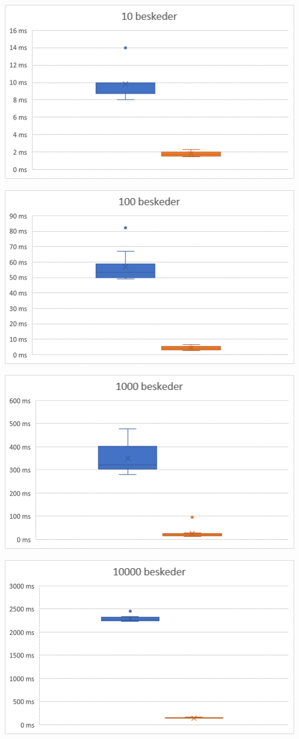 \documentclass[
]{article}
\begin{document}
\includegraphics[width=5in,height=3in]{media/media/image6.png}

\includegraphics[width=5in,height=3in]{media/media/image4.png}

\includegraphics[width=5in,height=3in]{media/media/image2.png}

\includegraphics[width=5in,height=3in]{media/media/image1.png}
\end{document}
